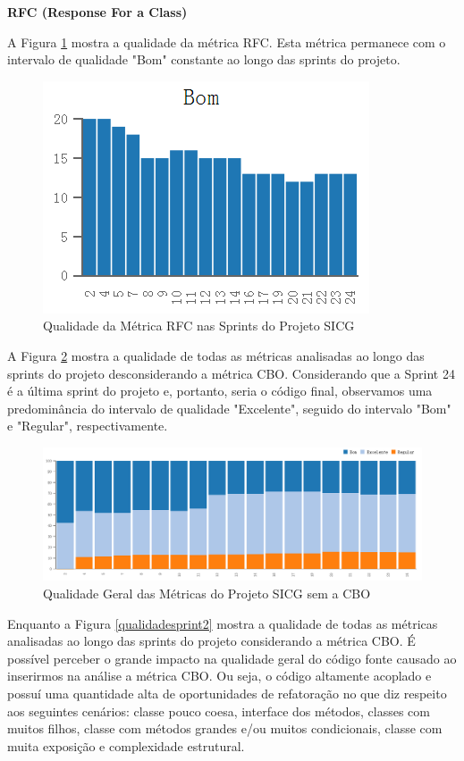\textbf{RFC (Response For a Class)} 

A Figura \ref{rfc} mostra a qualidade da métrica RFC. Esta métrica permanece com o intervalo de qualidade "Bom" constante ao longo das sprints do projeto.

\begin{figure}[H]
		\centering
			\includegraphics[scale=1.0]{figuras/rfc.png}
		\caption{Qualidade da Métrica RFC nas Sprints do Projeto SICG}
		\label{rfc}
\end{figure}

A Figura \ref{qualidadesprint} mostra a qualidade de todas as métricas analisadas ao longo das sprints do projeto desconsiderando a métrica CBO. Considerando que a Sprint 24 é a última sprint do projeto e, portanto, seria o código final, observamos uma predominância do intervalo de qualidade "Excelente", seguido do intervalo "Bom" e "Regular", respectivamente. 

\begin{figure}[H]
		\centering
			\includegraphics[scale=0.5]{figuras/todasmetricasSemCOB.png}
		\caption{Qualidade Geral das Métricas do Projeto SICG sem a CBO}
		\label{qualidadesprint}
\end{figure}

Enquanto a Figura \ref{qualidadesprint2} mostra a qualidade de todas as métricas analisadas ao longo das sprints do projeto considerando a métrica CBO. É possível perceber o grande impacto na qualidade geral do código fonte causado ao inserirmos na análise a métrica CBO. Ou seja, o código altamente acoplado e possuí uma quantidade alta de oportunidades de refatoração no que diz respeito aos seguintes cenários: classe pouco coesa, interface dos métodos, classes com muitos filhos, classe com métodos grandes e/ou muitos condicionais, classe com muita exposição e complexidade estrutural. 

